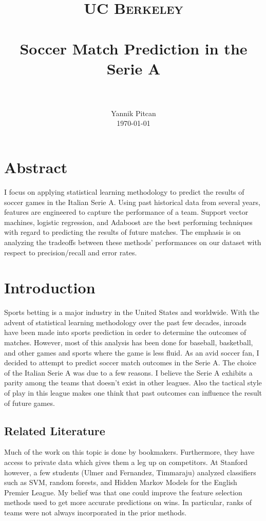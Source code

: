 \documentclass[paper=a4, fontsize=11pt]{scrartcl}
\title{
		\usefont{OT1}{bch}{b}{n}
		\normalfont \normalsize \textsc{UC Berkeley} \\ [25pt]
		\horrule{0.5pt} \\[0.4cm]
		\huge Soccer Match Prediction in the Serie A \\
		\horrule{2pt} \\[0.5cm]
}
\author{
		\normalfont 								\normalsize
        Yannik Pitcan\\[-3pt]		\normalsize
        \today
}
\date{}
\numberwithin{equation}{section}		%
\numberwithin{figure}{section}			%
\numberwithin{table}{section}				%
\begin{document}
\maketitle

\section{Abstract}
I focus on applying statistical learning methodology to predict the results of soccer games in the Italian Serie A. Using past historical data from several years, features are engineered to capture the performance of a team. Support vector machines, logistic regression, and Adaboost are the best performing techniques with regard to predicting the results of future matches. The emphasis is on analyzing the tradeoffs between these methods' performances on our dataset with respect to precision/recall and error rates.

\section{Introduction}
Sports betting is a major industry in the United States and worldwide. With the advent of statistical learning methodology over the past few decades, inroads have been made into sports prediction in order to determine the outcomes of matches. However, most of this analysis has been done for baseball, basketball, and other games and sports where the game is less fluid. As an avid soccer fan, I decided to attempt to predict soccer match outcomes in the Serie A. The choice of the Italian Serie A was due to a few reasons. I believe the Serie A exhibits a parity among the teams that doesn't exist in other leagues. Also the tactical style of play in this league makes one think that past outcomes can influence the result of future games.

\subsection{Related Literature}
Much of the work on this topic is done by bookmakers. Furthermore, they have access to private data which gives them a leg up on competitors. At Stanford however, a few students (Ulmer and Fernandez, Timmaraju) analyzed classifiers such as SVM, random forests, and Hidden Markov Models for the English Premier League. My belief was that one could improve the feature selection methods used to get more accurate predictions on wins. In particular, ranks of teams were not always incorporated in the prior methods.
\end{document}
